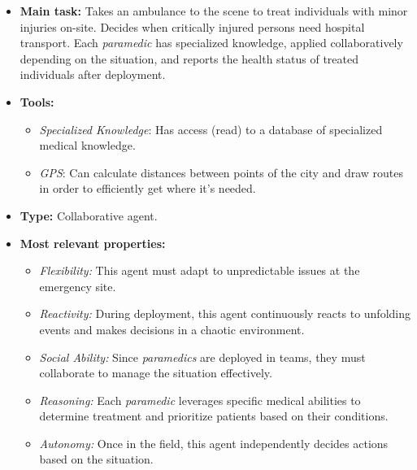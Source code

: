 \begin{itemize}
    \item \textbf{Main task:} Takes an ambulance to the scene to treat individuals with minor injuries on-site. Decides when critically injured persons need hospital transport. Each \textit{paramedic} has specialized knowledge, applied collaboratively depending on the situation, and reports the health status of treated individuals after deployment.
    \item \textbf{Tools:}
    \begin{itemize}
        \item \textit{Specialized Knowledge}: Has access (read) to a database of specialized medical knowledge.
        \item \textit{GPS}: Can calculate distances between points of the city and draw routes in order to efficiently get where it's needed.
    \end{itemize}
    \item \textbf{Type:} Collaborative agent.
    \item \textbf{Most relevant properties:}
    \begin{itemize}
        \item \textit{Flexibility:} This agent must adapt to unpredictable issues at the emergency site.
        \item \textit{Reactivity:} During deployment, this agent continuously reacts to unfolding events and makes decisions in a chaotic environment.
        \item \textit{Social Ability:} Since \textit{paramedics} are deployed in teams, they must collaborate to manage the situation effectively.
        \item \textit{Reasoning:} Each \textit{paramedic} leverages specific medical abilities to determine treatment and prioritize patients based on their conditions.
        \item \textit{Autonomy:} Once in the field, this agent independently decides actions based on the situation.
    \end{itemize}
\end{itemize}
